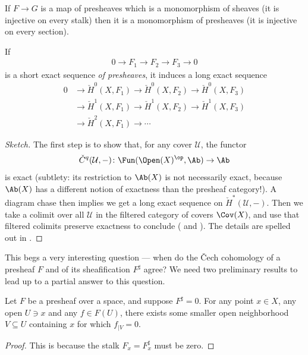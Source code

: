 \documentclass[11pt]{amsart}
\begin{document}
\begin{exercise}\label{exer:mono-sheaves-is-mono-presheaves} If $F \to G$ is a map of presheaves which is a monomorphism of sheaves (it is injective on every stalk) then it is a monomorphism of presheaves (it is injective on every section).
\end{exercise}


\begin{proposition}\label{prop:LES-Cech-cohomology-presheaves} 
If
\begin{align*}
    0 \to F_1 \to F_2 \to F_3 \to 0
\end{align*}
is a short exact sequence \emph{of presheaves}, it induces a long exact sequence
\begin{align*}
    0 &\to \check{H}^0(X,F_1) \to \check{H}^0(X,F_2) \to \check{H}^0(X,F_3) \\
    &\to \check{H}^1(X,F_1) \to \check{H}^1(X,F_2) \to \check{H}^1(X,F_3) \\
    &\to \check{H}^2(X,F_1) \to \cdots
\end{align*}
\end{proposition}
\begin{proof}[Sketch] The first step is to show that, for any cover $\mathcal{U}$, the functor
\begin{align*}
    \check{C}^q(\mathcal{U},-) \colon \Fun(\Open(X)^\op,\Ab) \to \Ab
\end{align*}
is exact (subtlety: its restriction to $\Ab(X)$ is not necessarily exact, because $\Ab(X)$ has a different notion of exactness than the presheaf category!). A diagram chase then implies we get a long exact sequence on $\check{H}^\ast(\mathcal{U},-)$. Then we take a colimit over all $\mathcal{U}$ in the filtered category of covers $\Cov(X)$, and use that filtered colimits preserve exactness to conclude ( and ). The details are spelled out in \cite[pp.~28--29]{Hirzebruch}.
\end{proof}

This begs a very interesting question --- when do the \v{C}ech cohomology of a presheaf $F$ and of its sheafification $F^\sharp$ agree? We need two preliminary results to lead up to a partial answer to this question.

\begin{proposition}\label{prop:property-of-pshf-sheafifying-to-zero} 
Let $F$ be a presheaf over a space, and suppose $F^\sharp = 0$. For any point $x\in X$, any open $U\ni x$ and any $f\in F(U)$, there exists some smaller open neighborhood $V \subseteq U$ containing $x$ for which $f_{|V} = 0$. 
\end{proposition}
\begin{proof} This is because the stalk $F_x = F^\sharp_x$ must be zero.
\end{proof}
\end{document}

